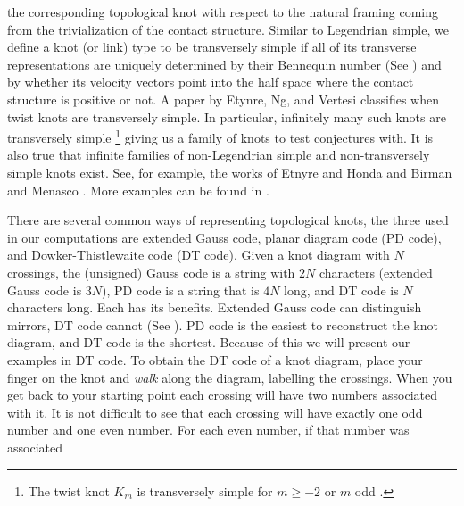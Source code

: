 \documentclass{article}
\theoremstyle{plain}
\begin{document}
        the corresponding topological knot with respect to the natural framing
        coming from the trivialization of the contact structure.
        Similar to Legendrian simple, we define a knot
        (or link) type to be transversely simple if all of its transverse
        representations are uniquely determined by their Bennequin number
        (See \cite{BirmanWrinkleTransversallySimpleKnots}) and by whether its
        velocity vectors point into the half space where the contact structure
        is positive or not. A paper by Etynre, Ng, and Vertesi
        \cite{EtnyreEtAlLegendrianAndTransverseTwistKnots}
        classifies when twist knots are transversely simple. In
        particular, infinitely many such knots are transversely simple%
        \footnote{%
            The twist knot $K_{m}$ is transversely simple for $m\geq{-2}$
            or $m$ odd \cite{EtnyreEtAlLegendrianAndTransverseTwistKnots}.
        }
        giving
        us a family of knots to test conjectures with. It is also true that
        infinite families of non-Legendrian simple and non-transversely simple
        knots exist. See, for example, the works of Etnyre and Honda
        \cite{EtnyreHondaCabling} and Birman and Menasco
        \cite{BirmanMenasco2006}. More examples can be found in
        \cite{Foldvari2019legnonsimple}.
        \par\hfill\par
        There are several common ways of representing topological knots, the
        three used in our computations are extended Gauss code, planar diagram
        code (PD code), and Dowker-Thistlewaite code (DT code). Given a knot
        diagram with $N$ crossings, the (unsigned) Gauss code is a string with $2N$
        characters (extended Gauss code is $3N$),
        PD code is a string that is $4N$ long, and DT code is $N$
        characters long. Each has its benefits. Extended Gauss code
        can distinguish mirrors, DT code cannot
        (See \cite{DOWKER198319}). PD code is the easiest to
        reconstruct the knot diagram, and DT code is the shortest. Because of
        this we will present our examples in DT code. To obtain the DT code of
        a knot diagram, place your finger on the knot and \textit{walk} along
        the diagram, labelling the crossings. When you get back to your starting
        point each crossing will have two numbers associated with it. It is
        not difficult to see that each crossing will have exactly one odd number
        and one even number. For each even number, if that number was associated
\end{document}
